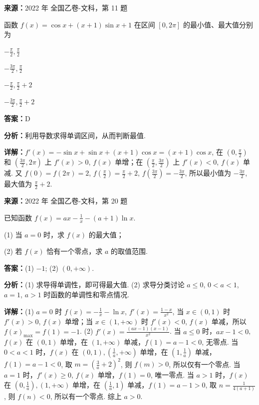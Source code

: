 \begin{question}[points=5]
\textbf{来源：}2022 年 全国乙卷-文科，第 11 题\par
函数 $f(x) = \cos x + (x+1)\sin x + 1$ 在区间 $[0, 2\pi]$ 的最小值、最大值分别为
\begin{choices}
  \item $-\frac{\pi}{2}, \frac{\pi}{2}$
  \item $-\frac{3\pi}{2}, \frac{\pi}{2}$
  \item $-\frac{\pi}{2}, \frac{\pi}{2}+2$
  \item $-\frac{3\pi}{2}, \frac{\pi}{2}+2$
\end{choices}
\begin{solution}
\textbf{答案：}D

\textbf{分析：}利用导数求得单调区间，从而判断最值.

\textbf{详解：}$f'(x) = -\sin x + \sin x + (x+1)\cos x = (x+1)\cos x$, 在 $(0,\frac{\pi}{2})$ 和 $(\frac{3\pi}{2},2\pi)$ 上 $f'(x)>0$, $f(x)$ 单增；在 $(\frac{\pi}{2},\frac{3\pi}{2})$ 上 $f'(x)<0$, $f(x)$ 单减. 又 $f(0)=f(2\pi)=2$, $f(\frac{\pi}{2})=\frac{\pi}{2}+2$, $f(\frac{3\pi}{2}) = -\frac{3\pi}{2}$, 所以最小值为 $-\frac{3\pi}{2}$, 最大值为 $\frac{\pi}{2}+2$.
\end{solution}
\end{question}

\begin{question}[points=12]
\textbf{来源：}2022 年 全国乙卷-文科，第 20 题\par
已知函数 $f(x) = ax - \frac{1}{x} - (a+1)\ln x$.

(1) 当 $a=0$ 时，求 $f(x)$ 的最大值；

(2) 若 $f(x)$ 恰有一个零点，求 $a$ 的取值范围.
\begin{solution}
\textbf{答案：}(1) $-1$; (2) $(0, +\infty)$.

\textbf{分析：}(1) 求导得单调性，即可得最大值.
(2) 求导分类讨论 $a\le0$, $0<a<1$, $a=1$, $a>1$ 时函数的单调性和零点情况.

\textbf{详解：}(1) $a=0$ 时 $f(x)=-\frac1x-\ln x$, $f'(x)=\frac{1-x}{x^2}$, 当 $x\in(0,1)$ 时 $f'(x)>0$, $f(x)$ 单增；当 $x\in(1,+\infty)$ 时 $f'(x)<0$, $f(x)$ 单减，所以 $f(x)_{\max}=f(1)=-1$.
(2) $f'(x)=\frac{(ax-1)(x-1)}{x^2}$. 当 $a\le0$ 时，$ax-1<0$, $f(x)$ 在 $(0,1)$ 单增，在 $(1,+\infty)$ 单减，$f(1)=a-1<0$, 无零点. 当 $0<a<1$ 时，$f(x)$ 在 $(0,1), (\frac1a,+\infty)$ 单增，在 $(1,\frac1a)$ 单减，$f(1)=a-1<0$, 取 $m=(\frac3a+2)^2$, 则 $f(m)>0$, 所以仅有一个零点. 当 $a=1$ 时，$f'(x)\ge0$, $f(x)$ 单增，$f(1)=0$, 唯一零点. 当 $a>1$ 时，$f(x)$ 在 $(0,\frac1a), (1,+\infty)$ 单增，在 $(\frac1a,1)$ 单减，$f(1)=a-1>0$, 取 $n=\frac1{4(a+1)}$, 则 $f(n)<0$, 所以有一个零点. 综上 $a>0$.
\end{solution}
\end{question}

